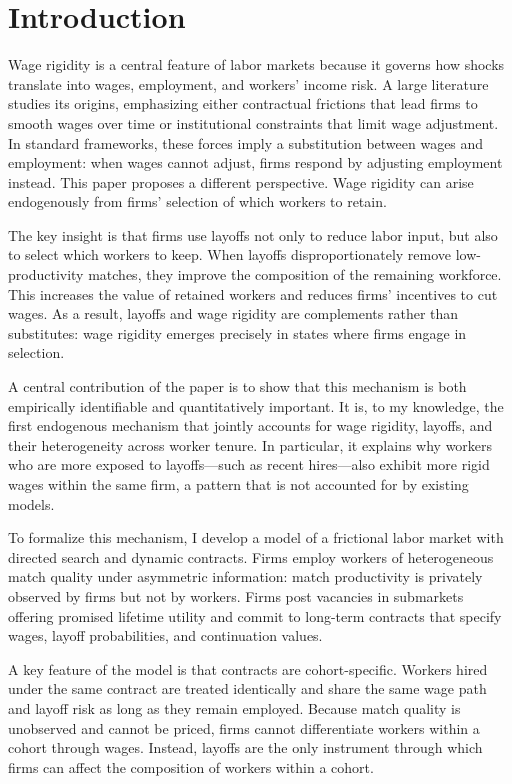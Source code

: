 \section{Introduction}

Wage rigidity is a central feature of labor markets because it governs how shocks translate into wages, employment, and workers’ income risk. A large literature studies its origins, emphasizing either contractual frictions that lead firms to smooth wages over time or institutional constraints that limit wage adjustment. In standard frameworks, these forces imply a substitution between wages and employment: when wages cannot adjust, firms respond by adjusting employment instead. This paper proposes a different perspective. Wage rigidity can arise endogenously from firms’ selection of which workers to retain.

The key insight is that firms use layoffs not only to reduce labor input, but also to select which workers to keep. When layoffs disproportionately remove low-productivity matches, they improve the composition of the remaining workforce. This increases the value of retained workers and reduces firms’ incentives to cut wages. As a result, layoffs and wage rigidity are complements rather than substitutes: wage rigidity emerges precisely in states where firms engage in selection.

A central contribution of the paper is to show that this mechanism is both empirically identifiable and quantitatively important. It is, to my knowledge, the first endogenous mechanism that jointly accounts for wage rigidity, layoffs, and their heterogeneity across worker tenure. In particular, it explains why workers who are more exposed to layoffs—such as recent hires—also exhibit more rigid wages within the same firm, a pattern that is not accounted for by existing models.

To formalize this mechanism, I develop a model of a frictional labor market with directed search and dynamic contracts. Firms employ workers of heterogeneous match quality under asymmetric information: match productivity is privately observed by firms but not by workers. Firms post vacancies in submarkets offering promised lifetime utility and commit to long-term contracts that specify wages, layoff probabilities, and continuation values.

A key feature of the model is that contracts are cohort-specific. Workers hired under the same contract are treated identically and share the same wage path and layoff risk as long as they remain employed. Because match quality is unobserved and cannot be priced, firms cannot differentiate workers within a cohort through wages. Instead, layoffs are the only instrument through which firms can affect the composition of workers within a cohort.

